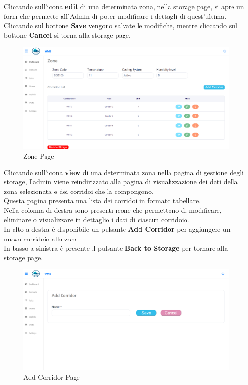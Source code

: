 Cliccando sull'icona \textbf{edit} di una determinata zona, nella storage page, si apre un form
che permette all'Admin di poter modificare i dettagli di quest'ultima.\\
Cliccando sul bottone \textbf{Save} vengono salvate le modifiche, mentre cliccando sul bottone \textbf{Cancel} si torna alla storage page.

\begin{figure}[H]
    \centering
    \includegraphics[width=\textwidth]{document/sections/img/Storyboard/viewZone.png}
    \caption{Zone Page}
    \label{fig:zonePage}
\end{figure}

Cliccando sull'icona \textbf{view} di una determinata zona nella pagina di gestione degli storage, l’admin viene reindirizzato alla pagina di visualizzazione dei dati della zona selezionata e dei corridoi che la compongono.\\
Questa pagina presenta una lista dei corridoi in formato tabellare.\\
Nella colonna di destra sono presenti icone che permettono di modificare, eliminare o visualizzare in dettaglio i dati di ciascun corridoio.\\
In alto a destra è disponibile un pulsante \textbf{Add Corridor} per aggiungere un nuovo corridoio alla zona.\\
In basso a sinistra è presente il pulsante \textbf{Back to Storage} per tornare alla storage page.

\begin{figure}[H]
    \centering
    \includegraphics[width=\textwidth]{document/sections/img/Storyboard/addCorridorPage.png}
    \caption{Add Corridor Page}
    \label{fig:addCorridorPages}
\end{figure}

